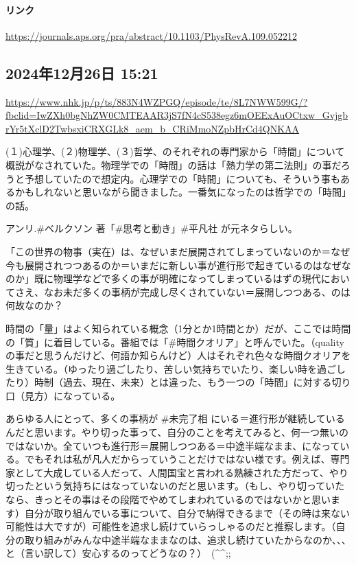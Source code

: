 \documentclass[facebook_diary.tex]{subfiles}
\begin{document}
\paragraph{リンク}
\url{https://journals.aps.org/pra/abstract/10.1103/PhysRevA.109.052212}

\subsection*{2024年12月26日 15:21}

\url{https://www.nhk.jp/p/ts/883N4WZPGQ/episode/te/8L7NWW599G/?fbclid=IwZXh0bgNhZW0CMTEAAR3jS7fN4cS538egz6mOEExAuOCtxw_GvjgbrYr5tXclD2TwbsxiCRXGLk8_aem_b_CRiMmoNZpbHrCd4QNKAA}




(１)心理学、(２)物理学、(３)哲学、のそれぞれの専門家から「時間」について概説がなされていた。物理学での「時間」の話は「熱力学の第二法則」の事だろうと予想していたので想定内。心理学での「時間」についても、そういう事もあるかもしれないと思いながら聞きました。一番気になったのは哲学での「時間」の話。


アンリ.\#ベルクソン 著「\#思考と動き」\#平凡社 が元ネタらしい。


「この世界の物事（実在）は、なぜいまだ展開されてしまっていないのか＝なぜ今も展開されつつあるのか＝いまだに新しい事が進行形で起きているのはなぜなのか」既に物理学などで多くの事が明確になってしまっているはずの現代においてさえ、なお未だ多くの事柄が完成し尽くされていない＝展開しつつある、のは何故なのか？


時間の「量」はよく知られている概念（1分とか1時間とか）だが、ここでは時間の「質」に着目している。番組では「\#時間クオリア」と呼んでいた。（qualityの事だと思うんだけど、何語か知らんけど）人はそれぞれ色々な時間クオリアを生きている。（ゆったり過ごしたり、苦しい気持ちでいたり、楽しい時を過ごしたり）時制（過去、現在、未来）とは違った、もう一つの「時間」に対する切り口（見方）になっている。


あらゆる人にとって、多くの事柄が \#未完了相 にいる＝進行形が継続しているんだと思います。やり切った事って、自分のことを考えてみると、何一つ無いのではないか。全ていつも進行形＝展開しつつある＝中途半端なまま、になっている。でもそれは私が凡人だからっていうことだけではない様です。例えば、専門家として大成している人だって、人間国宝と言われる熟練された方だって、やり切ったという気持ちにはなっていないのだと思います。（もし、やり切っていたなら、きっとその事はその段階でやめてしまわれているのではないかと思います）自分が取り組んでいる事について、自分で納得できるまで（その時は来ない可能性は大ですが）可能性を追求し続けていらっしゃるのだと推察します。（自分の取り組みがみんな中途半端なままなのは、追求し続けていたからなのか、、、と（言い訳して）安心するのってどうなの？）　(\textasciicircum{}\textasciicircum{};;
\end{document}
